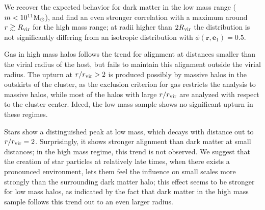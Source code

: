 \documentclass[useAMS,usenatbib]{mn2e}
\begin{document}
We recover the expected behavior for dark matter in the low mass range
($m<10^{11}{\rm M}_\odot$), and find an even stronger correlation with a
maximum around $r\gtrsim R_{\rm vir}$ for the high mass range; at radii higher
than $2R_{\rm vir}$ the distribution is not significantly differing from an
isotropic distribution with $\phi(\mathbf{r},\mathbf{e}_1)=0.5$.

Gas in high mass halos follows the trend for alignment at distances smaller
than the virial radius of the host, but fails to maintain this alignment
outside the virial radius. The upturn at $r/r_{\rm vir}>2$ is produced
possibly by massive halos in the outskirts of the cluster, as the exclusion
criterion for gas restricts the analysis to massive halos, while most of the
halos with large $r/r_{\rm vir}$ are analyzed with respect to the cluster
center. Ideed, the low mass sample shows no significant upturn in these
regimes.

Stars show a distinguished peak at low mass, which decays with distance out to
$r/r_{\rm vir}=2$. Surprisingly, it shows stronger alignment than dark matter
at small distances; in the high mass regime, this trend is not observed. We
suggest that the creation of star particles at relatively late times, when
there exists a pronounced environment, lets them feel the influence on small
scales more strongly than the surrounding dark matter halo; this effect seems
to be stronger for low mass halos, as indicated by the fact that dark matter
in the high mass sample follows this trend out to an even larger radius.
\end{document}

